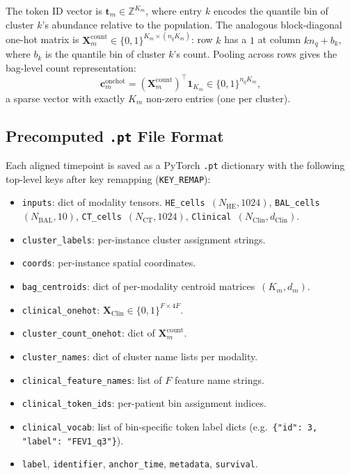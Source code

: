 \documentclass[11pt,a4paper]{article}
\begin{document}
The token ID vector is $\mathbf{t}_m \in \mathbb{Z}^{K_m}$, where entry $k$
encodes the quantile bin of cluster $k$'s abundance relative to the
population.
The analogous block-diagonal one-hot matrix is
$\mathbf{X}_m^\text{count} \in \{0,1\}^{K_m \times (n_q K_m)}$: row $k$ has a
$1$ at column $k n_q + b_k$, where $b_k$ is the quantile bin of cluster $k$'s
count.
Pooling across rows gives the bag-level count representation:
\begin{equation}
    \mathbf{c}_m^\text{onehot} = (\mathbf{X}_m^\text{count})^\top\mathbf{1}_{K_m}
    \in \{0,1\}^{n_q K_m},
\end{equation}
a sparse vector with exactly $K_m$ non-zero entries (one per cluster).

\subsection{Precomputed \texttt{.pt} File Format}

Each aligned timepoint is saved as a PyTorch \texttt{.pt} dictionary with the
following top-level keys after key remapping (\texttt{KEY\_REMAP}):

\begin{itemize}
    \item \texttt{inputs}: dict of modality tensors.
          \texttt{HE\_cells}~$(N_\text{HE}, 1024)$,
          \texttt{BAL\_cells}~$(N_\text{BAL}, 10)$,
          \texttt{CT\_cells}~$(N_\text{CT}, 1024)$,
          \texttt{Clinical}~$(N_\text{Clin}, d_\text{Clin})$.
    \item \texttt{cluster\_labels}: per-instance cluster assignment strings.
    \item \texttt{coords}: per-instance spatial coordinates.
    \item \texttt{bag\_centroids}: dict of per-modality centroid
          matrices~$(K_m, d_m)$.
    \item \texttt{clinical\_onehot}: $\mathbf{X}_\text{Clin}
          \in \{0,1\}^{F \times 4F}$.
    \item \texttt{cluster\_count\_onehot}: dict of $\mathbf{X}_m^\text{count}$.
    \item \texttt{cluster\_names}: dict of cluster name lists per modality.
    \item \texttt{clinical\_feature\_names}: list of $F$ feature name strings.
    \item \texttt{clinical\_token\_ids}: per-patient bin assignment indices.
    \item \texttt{clinical\_vocab}: list of bin-specific token label dicts
          (e.g.\ \texttt{\{"id": 3, "label": "FEV1\_q3"\}}).
    \item \texttt{label}, \texttt{identifier}, \texttt{anchor\_time},
          \texttt{metadata}, \texttt{survival}.
\end{itemize}
\end{document}
